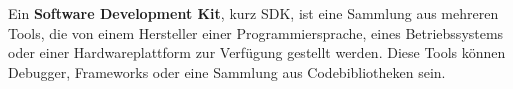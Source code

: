 Ein \textbf{Software Development Kit}, kurz SDK, ist eine Sammlung aus mehreren Tools, die von einem Hersteller einer Programmiersprache, eines Betriebssystems oder einer Hardwareplattform zur Verfügung gestellt werden. Diese Tools können Debugger, Frameworks oder eine Sammlung aus Codebibliotheken sein.